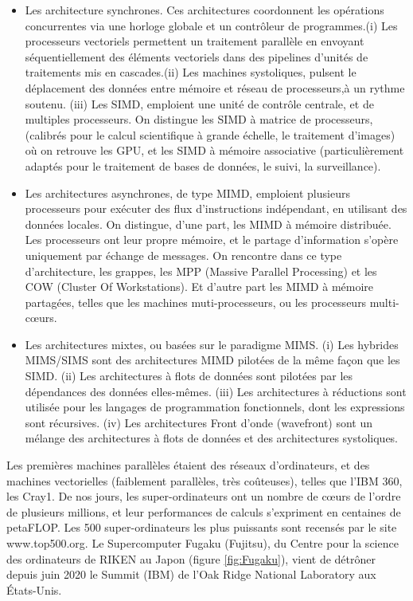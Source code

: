 \documentclass[a4paper,12pt]{report}
\theoremstyle{plain}				%
\theoremstyle{definition}				%
\newcommand{\tdi}[1]{\todo[inline]{{#1}}{}}
\newcommand{\lp}[1]{\todo[author=LP,color=yellow,inline]{#1}}
\begin{document}
\begin{itemize}
\item Les architecture synchrones.
  Ces architectures coordonnent les opérations concurrentes via une
  horloge globale et un contrôleur de programmes.(i) Les processeurs
  vectoriels permettent un traitement parallèle en envoyant
  séquentiellement des éléments vectoriels dans des pipelines d'unités
  de traitements mis en cascades.(ii) Les machines systoliques,
  pulsent le déplacement des données entre mémoire et réseau de
  processeurs,à un rythme soutenu.
  (iii) Les SIMD, emploient une unité de contrôle centrale, et de
  multiples processeurs.
  On distingue les SIMD à matrice de processeurs, (calibrés pour le
  calcul scientifique à grande échelle, le traitement d'images) où on
  retrouve les GPU, et les SIMD à mémoire associative
  (particulièrement adaptés pour le traitement de bases de données, le
  suivi, la surveillance).
\item Les architectures asynchrones, de type MIMD, emploient plusieurs
  processeurs pour exécuter des flux d'instructions indépendant, en
  utilisant des données locales.
  On distingue, d'une part, les MIMD à mémoire distribuée.
  Les processeurs ont leur propre mémoire, et le partage d'information
  s'opère uniquement par échange de messages.
  On rencontre dans ce type d'architecture, les grappes, les MPP
  (Massive Parallel Processing) et les COW (Cluster Of Workstations).
  Et d'autre part les MIMD à mémoire partagées, telles que les
  machines muti-processeurs, ou les processeurs multi-c\oe{}urs.
\item Les architectures mixtes, ou basées sur le paradigme MIMS.
  (i) Les hybrides MIMS/SIMS sont des architectures MIMD pilotées de
  la même façon que les SIMD.
  (ii) Les architectures à flots de données sont pilotées par les
  dépendances des données elles-mêmes.
  (iii) Les architectures à réductions sont utilisée pour les langages
  de programmation fonctionnels, dont les expressions sont récursives.
  (iv) Les architectures Front d'onde (wavefront) sont un mélange des
  architectures à flots de données et des architectures systoliques.

\end{itemize}




Les premières machines parallèles étaient des réseaux
d'ordinateurs, et des machines vectorielles (faiblement
parallèles, très coûteuses), telles que l'IBM 360, les
Cray1. 
De nos jours, les super-ordinateurs ont un nombre de c\oe{}urs de l'ordre de plusieurs millions, et leur performances de calculs s'expriment 
en centaines de petaFLOP. Les 500 super-ordinateurs les plus puissants 
sont recensés par le site www.top500.org. 
Le Supercomputer Fugaku (Fujitsu), du Centre pour la science 
des ordinateurs de RIKEN au Japon (figure \ref{fig:Fugaku}), 
vient de détrôner depuis juin 2020 le Summit (IBM) 
de l’Oak Ridge National Laboratory aux États-Unis.
\end{document}

